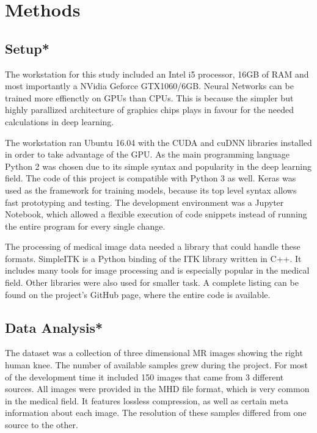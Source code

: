 \section{Methods}

\subsection{Setup*}

The workstation for this study included an Intel i5 processor, 16GB of RAM and most importantly a NVidia Geforce GTX1060/6GB. Neural Networks can be trained more effienctly on GPUs than CPUs. This is because the simpler but highly parallized architecture of graphics chips plays in favour for the needed calculations in deep learning.

The workstation ran Ubuntu 16.04 with the CUDA and cuDNN libraries installed in order to take advantage of the GPU. As the main programming language Python 2 was chosen due to its simple syntax and popularity in the deep learning field. The code of this project is compatible with Python 3 as well. Keras was used as the framework for training models, because its top level syntax allows fast prototyping and testing. The development environment was a Jupyter Notebook, which allowed a flexible execution of code snippets instead of running the entire program for every single change.

The processing of medical image data needed a library that could handle these formats. SimpleITK is a Python binding of the ITK library written in C++. It includes many tools for image processing and is especially popular in the medical field. Other libraries were also used for smaller task. A complete listing can be found on the project's GitHub page, where the entire code is available.

\subsection{Data Analysis*}

The dataset was a collection of three dimensional MR images showing the right human knee. The number of available samples grew during the project. For most of the development time it included 150 images that came from 3 different sources. All images were provided in the MHD file format, which is very common in the medical field. It features lossless compression, as well as certain meta information about each image. The resolution of these samples differed from one source to the other.


